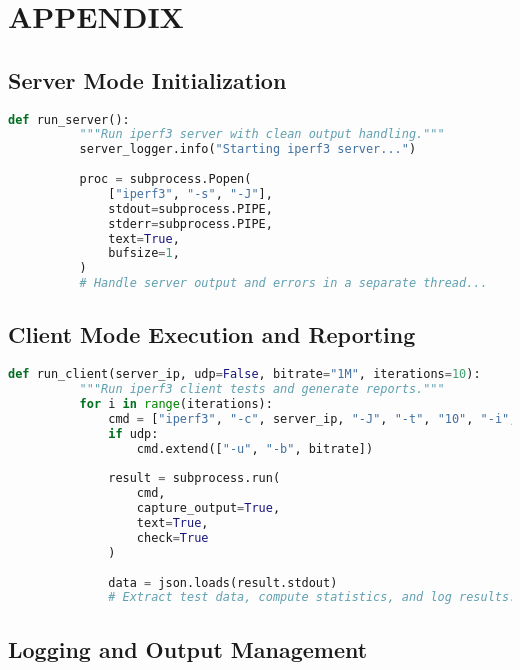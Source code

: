 
\section{APPENDIX} \label{sec:appendix}

    \subsection*{Server Mode Initialization}

        \begin{lstlisting}[language=Python, caption={Excerpt for server mode initialization.}]
      def run_server():
          """Run iperf3 server with clean output handling."""
          server_logger.info("Starting iperf3 server...")
          
          proc = subprocess.Popen(
              ["iperf3", "-s", "-J"],
              stdout=subprocess.PIPE,
              stderr=subprocess.PIPE,
              text=True,
              bufsize=1,
          )
          # Handle server output and errors in a separate thread...
        \end{lstlisting}

    \subsection*{Client Mode Execution and Reporting}

        \begin{lstlisting}[language=Python, caption={Excerpt for client mode execution.}]
      def run_client(server_ip, udp=False, bitrate="1M", iterations=10):
          """Run iperf3 client tests and generate reports."""
          for i in range(iterations):
              cmd = ["iperf3", "-c", server_ip, "-J", "-t", "10", "-i", "1"]
              if udp:
                  cmd.extend(["-u", "-b", bitrate])
              
              result = subprocess.run(
                  cmd,
                  capture_output=True,
                  text=True,
                  check=True
              )
              
              data = json.loads(result.stdout)
              # Extract test data, compute statistics, and log results...
        \end{lstlisting}

    \subsection*{Logging and Output Management}

